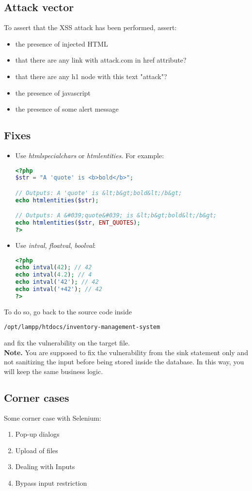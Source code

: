 \documentclass[a4paper, 10pt, titlepage]{article}
\begin{document}
\subsection*{Attack vector}
To assert that the XSS attack has been performed, assert:
\begin{itemize}
\item the presence of injected HTML
\item that there are any link with attack.com in href attribute?
\item that there are any h1 node with this text "attack"?
\item the presence of javascript
\item the presence of some alert message
\end{itemize}

\subsection*{Fixes}
\begin{itemize}
\item Use \textit{htmlspecialchars} or \textit{htmlentities}. For example:
\begin{lstlisting}[language=php]
<?php
$str = "A 'quote' is <b>bold</b>";

// Outputs: A 'quote' is &lt;b&gt;bold&lt;/b&gt;
echo htmlentities($str);

// Outputs: A &#039;quote&#039; is &lt;b&gt;bold&lt;/b&gt;
echo htmlentities($str, ENT_QUOTES);
?>
\end{lstlisting}

\item Use \textit{intval}, \textit{floatval}, \textit{boolval}:
\begin{lstlisting}[language=php]
<?php
echo intval(42); // 42
echo intval(4.2); // 4
echo intval('42'); // 42
echo intval('+42'); // 42
?>
\end{lstlisting}
\end{itemize}
To do so, go back to the source code inside
\begin{verbatim}
/opt/lampp/htdocs/inventory-management-system
\end{verbatim}
and fix the vulnerability on the target file.\medskip \\
\textbf{Note.} You are supposed to fix the vulnerability from the sink statement only and not sanitizing the input before being stored inside the database. In this way, you will keep the same business logic.

\subsection*{Corner cases}
Some corner case with Selenium:
\begin{enumerate}
\item Pop-up dialogs
\item Upload of files
\item Dealing with Inputs
\item Bypass input restriction
\end{enumerate}
\end{document}
